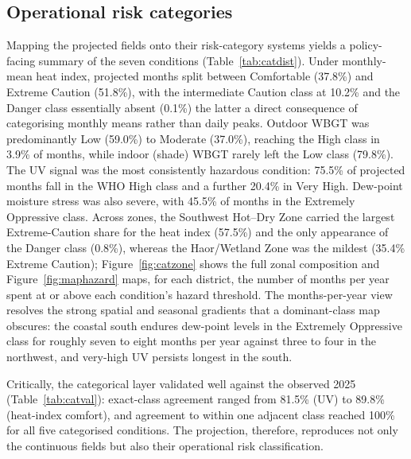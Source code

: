 \documentclass[review,11pt]{elsarticle}
\begin{document}
\subsection{Operational risk categories}\label{sec:res-categories}
Mapping the projected fields onto their risk-category systems yields a
policy-facing summary of the seven conditions (Table~\ref{tab:catdist}). Under
monthly-mean heat index, projected months split between Comfortable (37.8\%) and
Extreme Caution (51.8\%), with the intermediate Caution class at 10.2\% and the
Danger class essentially absent (0.1\%) the latter a direct consequence of
categorising monthly means rather than daily peaks. Outdoor WBGT was
predominantly Low (59.0\%) to Moderate (37.0\%), reaching the High class in
3.9\% of months, while indoor (shade) WBGT rarely left the Low class (79.8\%).
The UV signal was the most consistently hazardous condition: 75.5\% of projected
months fall in the WHO High class and a further 20.4\% in Very High. Dew-point
moisture stress was also severe, with 45.5\% of months in the Extremely
Oppressive class. Across zones, the Southwest Hot--Dry Zone carried the largest
Extreme-Caution share for the heat index (57.5\%) and the only appearance of the
Danger class (0.8\%), whereas the Haor/Wetland Zone was the mildest (35.4\%
Extreme Caution); Figure~\ref{fig:catzone} shows the full zonal composition and
Figure~\ref{fig:maphazard} maps, for each district, the number of months per year
spent at or above each condition's hazard threshold. The months-per-year view
resolves the strong spatial and seasonal gradients that a dominant-class map
obscures: the coastal south endures dew-point levels in the Extremely Oppressive
class for roughly seven to eight months per year against three to four in the
northwest, and very-high UV persists longest in the south.

Critically, the categorical layer validated well against the observed 2025
(Table~\ref{tab:catval}): exact-class agreement ranged from 81.5\% (UV) to
89.8\% (heat-index comfort), and agreement to within one adjacent class reached
100\% for all five categorised conditions. The projection, therefore, reproduces
not only the continuous fields but also their operational risk classification.

\begin{table}[htbp]
\centering
\caption{Projected risk-category distribution (share of projected
district-months, 2025--2026, 64 districts). Only populated categories are shown.}
\label{tab:catdist}

\end{table}
\end{document}
